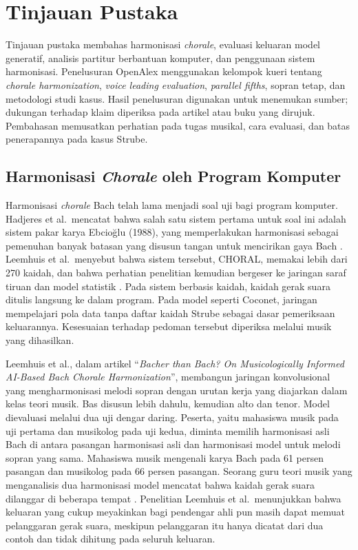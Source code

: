 
\section{Tinjauan Pustaka}\label{sec:tinjauan-pustaka}

Tinjauan pustaka membahas harmonisasi \textit{chorale}, evaluasi keluaran model generatif, analisis partitur berbantuan komputer, dan penggunaan sistem harmonisasi. Penelusuran OpenAlex menggunakan kelompok kueri tentang \textit{chorale harmonization}, \textit{voice leading evaluation}, \textit{parallel fifths}, sopran tetap, dan metodologi studi kasus. Hasil penelusuran digunakan untuk menemukan sumber; dukungan terhadap klaim diperiksa pada artikel atau buku yang dirujuk. Pembahasan memusatkan perhatian pada tugas musikal, cara evaluasi, dan batas penerapannya pada kasus Strube.

\subsection{Harmonisasi \textit{Chorale} oleh Program Komputer}\label{sec:harmonisasi-chorale}

Harmonisasi \textit{chorale} Bach telah lama menjadi soal uji bagi program komputer. Hadjeres et al.\ mencatat bahwa salah satu sistem pertama untuk soal ini adalah sistem pakar karya Ebcioğlu (1988), yang memperlakukan harmonisasi sebagai pemenuhan banyak batasan yang disusun tangan untuk mencirikan gaya Bach \parencite[1362]{hadjeres2017}. Leemhuis et al.\ menyebut bahwa sistem tersebut, CHORAL, memakai lebih dari 270 kaidah, dan bahwa perhatian penelitian kemudian bergeser ke jaringan saraf tiruan dan model statistik \parencite{leemhuis2020}. Pada sistem berbasis kaidah, kaidah gerak suara ditulis langsung ke dalam program. Pada model seperti Coconet, jaringan mempelajari pola data tanpa daftar kaidah Strube sebagai dasar pemeriksaan keluarannya. Kesesuaian terhadap pedoman tersebut diperiksa melalui musik yang dihasilkan.

Leemhuis et al., dalam artikel ``\textit{Bacher than Bach? On Musicologically Informed AI-Based Bach Chorale Harmonization}'', membangun jaringan konvolusional yang mengharmonisasi melodi sopran dengan urutan kerja yang diajarkan dalam kelas teori musik. Bas disusun lebih dahulu, kemudian alto dan tenor. Model dievaluasi melalui dua uji dengar daring. Peserta, yaitu mahasiswa musik pada uji pertama dan musikolog pada uji kedua, diminta memilih harmonisasi asli Bach di antara pasangan harmonisasi asli dan harmonisasi model untuk melodi sopran yang sama. Mahasiswa musik mengenali karya Bach pada 61 persen pasangan dan musikolog pada 66 persen pasangan. Seorang guru teori musik yang menganalisis dua harmonisasi model mencatat bahwa kaidah gerak suara dilanggar di beberapa tempat \parencite{leemhuis2020}. Penelitian Leemhuis et al.\ menunjukkan bahwa keluaran yang cukup meyakinkan bagi pendengar ahli pun masih dapat memuat pelanggaran gerak suara, meskipun pelanggaran itu hanya dicatat dari dua contoh dan tidak dihitung pada seluruh keluaran.

